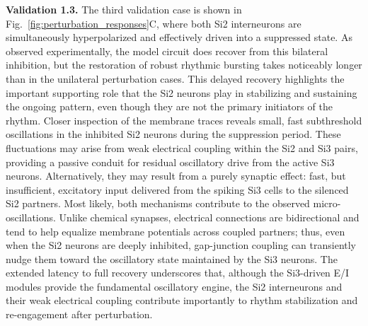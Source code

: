 \documentclass[nofootinbib,aip,amsmath,amssymb,preprint,twocolumn,floatfix,10pt]{revtex4-2}
\begin{document}
{\bf Validation 1.3.} The third validation case is shown in Fig.~\ref{fig:perturbation_responses}C, where both Si2 interneurons are simultaneously hyperpolarized and effectively driven into a suppressed state. As observed experimentally, the model circuit does recover from this bilateral inhibition, but the restoration of robust rhythmic bursting takes noticeably longer than in the unilateral perturbation cases. This delayed recovery highlights the important supporting role that the Si2 neurons play in stabilizing and sustaining the ongoing pattern, even though they are not the primary initiators of the rhythm.
Closer inspection of the membrane traces reveals small, fast subthreshold oscillations in the inhibited Si2 neurons during the suppression period. These fluctuations may arise from weak electrical coupling within the Si2 and Si3 pairs, providing a passive conduit for residual oscillatory drive from the active Si3 neurons. Alternatively, they may result from a purely synaptic effect: fast, but insufficient, excitatory input delivered from the spiking Si3 cells to the silenced Si2 partners. Most likely, both mechanisms contribute to the observed micro-oscillations. Unlike chemical synapses, electrical connections are bidirectional and tend to help equalize membrane potentials across coupled partners; thus, even when the Si2 neurons are deeply inhibited, gap-junction coupling can transiently nudge them toward the oscillatory state maintained by the Si3 neurons. The extended latency to full recovery underscores that, although the Si3-driven E/I modules provide the fundamental oscillatory engine, the Si2 interneurons and their weak electrical coupling contribute importantly to rhythm stabilization and re-engagement after perturbation.
\end{document}
